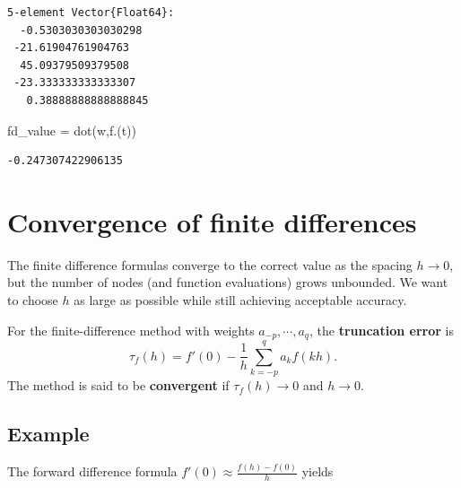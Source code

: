 \documentclass[
]{article}
\newenvironment{Shaded}{\begin{snugshade}}{\end{snugshade}}
\newcommand{\FunctionTok}[1]{\textcolor[rgb]{0.28,0.35,0.67}{#1}}
\newcommand{\NormalTok}[1]{\textcolor[rgb]{0.00,0.23,0.31}{#1}}
\newcommand{\OperatorTok}[1]{\textcolor[rgb]{0.37,0.37,0.37}{#1}}
\begin{document}
\begin{verbatim}
5-element Vector{Float64}:
  -0.5303030303030298
 -21.61904761904763
  45.09379509379508
 -23.333333333333307
   0.38888888888888845
\end{verbatim}

\begin{Shaded}
\begin{Highlighting}[]
\NormalTok{fd\_value }\OperatorTok{=} \FunctionTok{dot}\NormalTok{(w,}\FunctionTok{f}\NormalTok{.(t))}
\end{Highlighting}
\end{Shaded}

\begin{verbatim}
-0.247307422906135
\end{verbatim}

\section{Convergence of finite
differences}\label{convergence-of-finite-differences}

The finite difference formulas converge to the correct value as the
spacing \(h \rightarrow 0\), but the number of nodes (and function
evaluations) grows unbounded. We want to choose \(h\) as large as
possible while still achieving acceptable accuracy.

\begin{tcolorbox}[enhanced jigsaw, left=2mm, arc=.35mm, leftrule=.75mm, colbacktitle=quarto-callout-note-color!10!white, coltitle=black, toptitle=1mm, bottomtitle=1mm, colback=white, colframe=quarto-callout-note-color-frame, opacityback=0, breakable, titlerule=0mm, title={Definition: Truncation error of a finite-difference formula}, rightrule=.15mm, bottomrule=.15mm, toprule=.15mm, opacitybacktitle=0.6]

For the finite-difference method with weights \(a_{-p}, \cdots, a_q\),
the \textbf{truncation error} is
\[\tau_f(h) = f'(0) - \frac{1}{h} \sum_{k = -p}^q a_k f(kh).\] The
method is said to be \textbf{convergent} if \(\tau_f(h) \rightarrow 0\)
and \(h \rightarrow 0\).

\end{tcolorbox}

\subsection{Example}\label{example}

The forward difference formula \(f'(0) \approx \frac{f(h) - f(0)}{h}\)
yields
\end{document}
